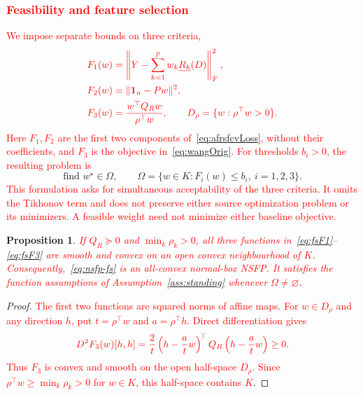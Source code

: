\documentclass[]{interact}
\theoremstyle{plain}
\newtheorem{proposition}[theorem]{Proposition}
\theoremstyle{definition}
\theoremstyle{remark}
\begin{document}
\subsubsection{\textcolor{red}{Feasibility and feature selection}}\label{ssec:reduction}\label{ssec:selection}
\leavevmode\textcolor{red}{We impose separate bounds on three criteria,}
\begin{align}\color{red}
F_1(w)&\color{red}=\left\|Y-\sum_{k=1}^{p}w_k\underline{R_k}(D)\right\|_F^2,\label{eq:fsF1}\\\color{red}
F_2(w)&\color{red}=\|\mathbf1_n-Pw\|^2,\label{eq:fsF2}\\\color{red}
F_3(w)&\color{red}=\frac{w^{\top}Q_Rw}{\rho^{\top}w},\qquad D_\rho=\{w:\rho^{\top}w>0\}.\label{eq:fsF3}
\end{align}
\leavevmode\textcolor{red}{Here $F_1,F_2$ are the first two components of~\eqref{eq:afrsfcvLoss}, without their coefficients, and $F_3$ is the objective in~\eqref{eq:wangOrig}. For thresholds $b_i>0$, the resulting problem is}
\begin{equation}\label{eq:nsfp-fs}
\text{find }w^\star\in\Omega,\qquad \Omega=\{w\in K:F_i(w)\le b_i,\ i=1,2,3\}.
\end{equation}
\leavevmode\textcolor{red}{This formulation asks for simultaneous acceptability of the three criteria. It omits the Tikhonov term and does not preserve either source optimization problem or its minimizers. A feasible weight need not minimize either baseline objective.}

\begin{proposition}\label{prop:fs-reg}
\leavevmode\textcolor{red}{If $Q_R\succeq0$ and $\min_k\rho_k>0$, all three functions in~\eqref{eq:fsF1}--\eqref{eq:fsF3} are smooth and convex on an open convex neighbourhood of $K$. Consequently,~\eqref{eq:nsfp-fs} is an all-convex normal-box NSFP. It satisfies the function assumptions of Assumption~\ref{ass:standing} whenever $\Omega\ne\varnothing$}.
\end{proposition}
\begin{proof}
\leavevmode\textcolor{red}{The first two functions are squared norms of affine maps. For $w\in D_\rho$ and any direction $h$, put $t=\rho^{\top}w$ and $a=\rho^{\top}h$. Direct differentiation gives}
\begin{equation}\label{eq:fsF3-curvature}\textcolor{red}{
D^2F_3(w)[h,h]=\frac2t\left(h-\frac atw\right)^{\!\top}Q_R\left(h-\frac atw\right)\ge0.
}\end{equation}
\leavevmode\textcolor{red}{Thus $F_3$ is convex and smooth on the open half-space $D_\rho$. Since $\rho^{\top}w\ge\min_k\rho_k>0$ for $w\in K$, this half-space contains $K$}.
\end{proof}
\end{document}
